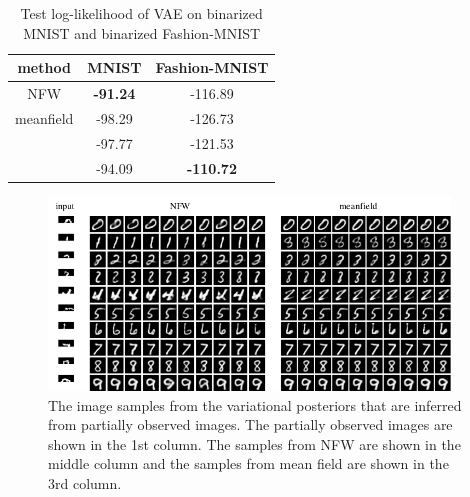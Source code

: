 \documentclass{article}
\newcommand{\acr}[1]{\textsc{#1}\xspace}
\newcommand{\us}{\acr{NFW}}
\begin{document}
\begin{table}
\centering
 \begin{tabular}{c c c} 
 \hline
 method & MNIST & Fashion-MNIST  \\ [0.5ex] 
 \hline\hline
 \us & \textbf{-91.24} & -116.89 \\
 meanfield & -98.29 & -126.73  \\ 
 \citep{YinZhou2018} & -97.77 & -121.53 \\
 \citep{TitsiasRuiz2019} & -94.09 & \textbf{-110.72}  \\ 
 \hline
\end{tabular}
\caption{Test log-likelihood of VAE on binarized MNIST and binarized Fashion-MNIST} \label{tab:vae}
\vspace{-5mm}
\end{table}

\begin{figure}
\centering
\includegraphics[width=0.95\textwidth]{mnist_imputation_wn.pdf} 
\caption{The image samples from the variational posteriors that are inferred from partially observed images. The partially observed images are shown in the 1st column. The samples from \us are shown in the middle column and the samples from mean field are shown in the 3rd column. } \label{fig:mnist_imp}
\end{figure}
\end{document}
